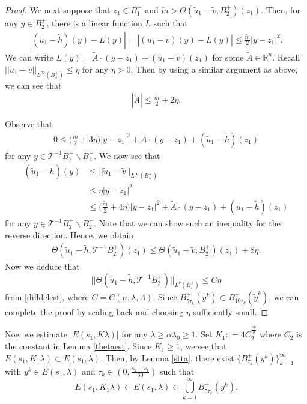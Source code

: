 \documentclass[11pt, reqno]{amsart}
\numberwithin{equation}{section}
\begin{document}
\begin{proof}
We next suppose that $z_{1} \in B_{1}^{+}$ and $\tilde{m} >\Theta(\tilde{u}_{1}-\tilde{v}
,B_{2}^{+})(z_{1})$.
Then, for any $y \in B_{2}^{+}$, there is a linear function $\overline{L}$ such that
\begin{align*}
|(\tilde{u}_{1}-\tilde{h})(y)-\overline{L}(y)|=|(\tilde{u}_{1}-\tilde{v})(y)-\overline{L}(y)|
\le \frac{\tilde{m}}{2}|y-z_{1}|^{2}.
\end{align*}
We can write $\overline{L}(y)=\tilde{A}\cdot(y-z_{1})+(\tilde{u}_{1}-\tilde{v})(z_{1})$ for some
$\tilde{A} \in \mathbb{R}^{n}$.
Recall $||\tilde{u}_{1}-\tilde{v}||_{L^{\infty}(B_{4}^{+})} \le \eta$ for any $\eta>0$.
Then by using a similar argument as above, we can see that
\begin{align} \label{tgraest}
|\tilde{A}| \le \frac{\tilde{m}}{2}+2\eta.
\end{align}

Observe that
\begin{align*}
0 \le \bigg( \frac{\tilde{m}}{2}+3\eta\bigg)|y-z_{1}|^{2}
+\tilde{A}\cdot(y-z_{1})+ (\tilde{u}_{1}-\tilde{h})(z_{1})
\end{align*}
for any $y \in  \mathcal{T}^{-1}B_{2}^{+}  \backslash B_{2}^{+}  $.
We now see that
\begin{align*}
(\tilde{u}_{1}-\tilde{h})(y) & \le ||\tilde{u}_{1}-\tilde{v}||_{L^{\infty}(B_{4}^{+})}
\\& \le \eta|y-z_{1}|^{2}
\\ & \le \bigg( \frac{\tilde{m}}{2}+ 4\eta \bigg)|y-z_{1}|^{2}
+\tilde{A}\cdot(y-z_{1})+ (\tilde{u}_{1}-\tilde{h})(z_{1})
\end{align*}
for any $y \in  \mathcal{T}^{-1}B_{2}^{+}  \backslash B_{2}^{+}  $.
Note that we can show such an inequality for the reverse direction.
Hence, we obtain
\begin{align*}
\Theta(\tilde{u}_{1}-\tilde{h}, \mathcal{T}^{-1}B_{2}^{+} )(z_{1}) \le
\Theta(\tilde{u}_{1}-\tilde{v},B_{2}^{+})(z_{1})  +8\eta.
\end{align*}
Now we deduce that
$$ ||\Theta(\tilde{u}_{1}-\tilde{h},\mathcal{T}^{-1}B_{2}^{+} )||_{L^{\nu}(B_{1}^{+})} \le C\eta $$
from \eqref{difldelest}, where $C = C(n,\lambda,\Lambda)$.
Since $B_{5\tau_{k}}^{+}(y^{k})\subset B_{10\tau_{k}}^{+}(\tilde{y}^{k}) $,
we can complete the proof by scaling back and choosing $\eta$ sufficiently small.
\end{proof}


Now we estimate $|E(s_{1},K\lambda)|$ for any $\lambda \ge \alpha \lambda_{0} \ge 1$.
Set $K_1: =4C_{2}^{\frac{\nu p}{q}}$ where $C_{2}$ is the constant in Lemma \ref{thetaest}.
Since $K_1 \ge 1$, we see that $E(s_{1},K_1\lambda) \subset E(s_{1},\lambda)$.
Then, by Lemma \ref{stta}, there exist
$\{ B_{\tau_{k}}^{+}(y^{k}) \}_{k=1}^{\infty}$ with $y^{k} \in E(s_{1},\lambda)$ and $\tau_{k}\in (0, \frac{ s_{2}-s_{1}}{60})$
such that
$$ E(s_{1},K_1\lambda) \subset  E(s_{1},\lambda) \subset \bigcup_{k=1}^{\infty}B_{5\tau_{k}}^{+}(y^{k}).  $$
\end{document}

